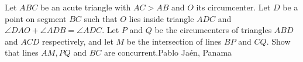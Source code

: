 Let $ABC$ be an acute triangle with $AC > AB$ and $O$ its circumcenter. Let $D$ be a point on segment $BC$ such that $O$ lies inside triangle $ADC$ and $\angle DAO + \angle ADB = \angle ADC$. Let $P$ and $Q$ be the circumcenters of triangles $ABD$ and $ACD$ respectively, and let $M$ be the intersection of lines $BP$ and $CQ$. Show that lines $AM, PQ$ and $BC$ are concurrent.Pablo Jaén, Panama